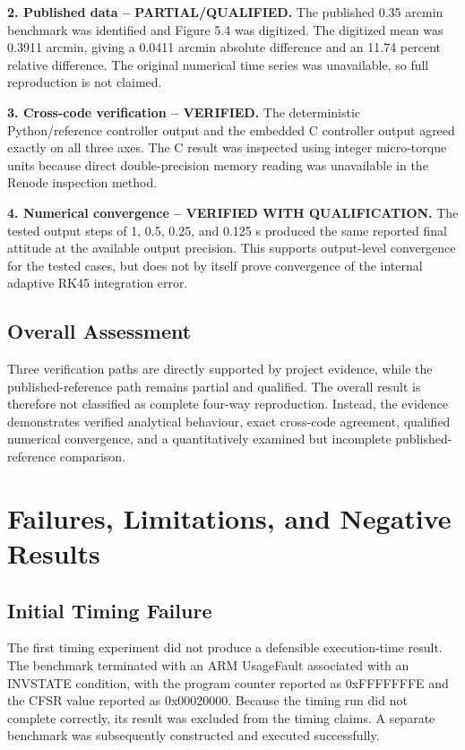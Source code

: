 \documentclass[11pt,a4paper]{article}
\begin{document}
\textbf{2. Published data -- PARTIAL/QUALIFIED.} The published 0.35 arcmin benchmark was identified and Figure 5.4 was digitized. The digitized mean was 0.3911 arcmin, giving a 0.0411 arcmin absolute difference and an 11.74 percent relative difference. The original numerical time series was unavailable, so full reproduction is not claimed.

\textbf{3. Cross-code verification -- VERIFIED.} The deterministic Python/reference controller output and the embedded C controller output agreed exactly on all three axes. The C result was inspected using integer micro-torque units because direct double-precision memory reading was unavailable in the Renode inspection method.

\textbf{4. Numerical convergence -- VERIFIED WITH QUALIFICATION.} The tested output steps of 1, 0.5, 0.25, and 0.125 s produced the same reported final attitude at the available output precision. This supports output-level convergence for the tested cases, but does not by itself prove convergence of the internal adaptive RK45 integration error.

\subsection{Overall Assessment}

Three verification paths are directly supported by project evidence, while the published-reference path remains partial and qualified. The overall result is therefore not classified as complete four-way reproduction. Instead, the evidence demonstrates verified analytical behaviour, exact cross-code agreement, qualified numerical convergence, and a quantitatively examined but incomplete published-reference comparison.


\section{Failures, Limitations, and Negative Results}

\subsection{Initial Timing Failure}

The first timing experiment did not produce a defensible execution-time result. The benchmark terminated with an ARM UsageFault associated with an INVSTATE condition, with the program counter reported as 0xFFFFFFFE and the CFSR value reported as 0x00020000. Because the timing run did not complete correctly, its result was excluded from the timing claims. A separate benchmark was subsequently constructed and executed successfully.
\end{document}
